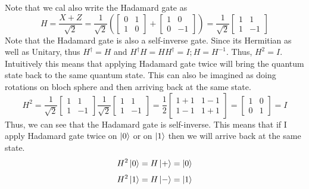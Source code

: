 Note that we cal also write the Hadamard gate as 
\[
H=\frac{X+Z}{\sqrt{2}}=\frac{1}{\sqrt{2}}\left(\begin{bmatrix} 0 & 1 \\ 1 & 0 \end{bmatrix}+\begin{bmatrix} 1 & 0 \\ 0& -1 \end{bmatrix} \right)=\frac{1}{\sqrt{2}}\begin{bmatrix} 1 & 1 \\ 1 & -1 \end{bmatrix}
\]
Note that the Hadamard gate is also a self-inverse gate. Since its Hermitian as well as Unitary, thus $H^{\dagger}=H$ and $H^{\dagger}H=HH^{\dagger}=I; H=H^{-1}$.
Thus, $H^2=I$. Intuitively this means that applying Hadamard gate twice will bring the quantum state back to the same quantum state. This can also be imagined 
as doing rotations on bloch sphere and then arriving back at the same state.
\[ H^2=\dfrac{1}{\sqrt{2}}\begin{bmatrix}
    1 & 1 \\
    1 & -1
\end{bmatrix}\dfrac{1}{\sqrt{2}}\begin{bmatrix}
    1 & 1 \\
    1 & -1
\end{bmatrix}=\dfrac{1}{2}\begin{bmatrix}
    1+1 & 1-1 \\
    1-1 & 1+1
\end{bmatrix}=\begin{bmatrix}
    1 & 0 \\
    0 & 1
\end{bmatrix}=I
\]
Thus, we can see that the Hadamard gate is self-inverse.
This means that if I apply Hadamard gate twice on $\ket{0}$ or on $\ket{1}$ then we will arrive back
at the same state. 
\[ H^2\ket{0}=H\ket{+}=\ket{0} \]
\[ H^2\ket{1}=H\ket{-}=\ket{1} \]

